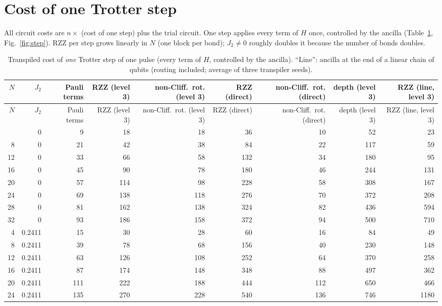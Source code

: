 \documentclass[11pt]{article}
\begin{document}
\section{Cost of one Trotter step}\label{sec:step}
All circuit costs are $n\times$ (cost of one step) plus the trial circuit. One step applies every term of $H$ once, controlled by the ancilla (Table~\ref{tab:ps}, Fig.~\ref{fig:step}). RZZ per step grows linearly in $N$ (one block per bond); $J_2\neq0$ roughly doubles it because the number of bonds doubles.
{\small
\begin{longtable}{rrrrrrrrr}
\caption{Transpiled cost of \emph{one} Trotter step of one pulse (every term of $H$, controlled by the ancilla). ``Line'': ancilla at the end of a linear chain of qubits (routing included; average of three transpiler seeds).}\label{tab:ps}\\
\toprule
$N$ & $J_2$ & Pauli terms & RZZ (level 3) & non-Cliff.\ rot. (level 3) & RZZ (direct) & non-Cliff.\ rot. (direct) & depth (level 3) & RZZ (line, level 3) \\
\midrule
\endfirsthead
\toprule
$N$ & $J_2$ & Pauli terms & RZZ (level 3) & non-Cliff.\ rot. (level 3) & RZZ (direct) & non-Cliff.\ rot. (direct) & depth (level 3) & RZZ (line, level 3) \\
\midrule
\endhead
\bottomrule
\endfoot
4 & 0 & 9 & 18 & 18 & 36 & 10 & 52 & 23 \\
8 & 0 & 21 & 42 & 38 & 84 & 22 & 117 & 59 \\
12 & 0 & 33 & 66 & 58 & 132 & 34 & 180 & 95 \\
16 & 0 & 45 & 90 & 78 & 180 & 46 & 244 & 131 \\
20 & 0 & 57 & 114 & 98 & 228 & 58 & 308 & 167 \\
24 & 0 & 69 & 138 & 118 & 276 & 70 & 372 & 208 \\
28 & 0 & 81 & 162 & 138 & 324 & 82 & 436 & 594 \\
32 & 0 & 93 & 186 & 158 & 372 & 94 & 500 & 710 \\
4 & 0.2411 & 15 & 30 & 28 & 60 & 16 & 84 & 49 \\
8 & 0.2411 & 39 & 78 & 68 & 156 & 40 & 230 & 148 \\
12 & 0.2411 & 63 & 126 & 108 & 252 & 64 & 370 & 258 \\
16 & 0.2411 & 87 & 174 & 148 & 348 & 88 & 497 & 362 \\
20 & 0.2411 & 111 & 222 & 188 & 444 & 112 & 650 & 466 \\
24 & 0.2411 & 135 & 270 & 228 & 540 & 136 & 746 & 1180 \\

\end{longtable}}
\end{document}
